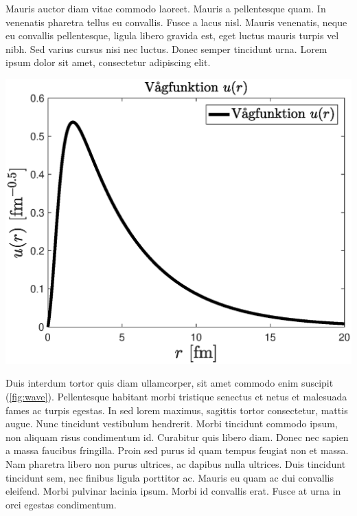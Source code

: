 Mauris auctor diam vitae commodo laoreet. Mauris a pellentesque quam. In venenatis pharetra tellus eu convallis. Fusce a lacus nisl. Mauris venenatis, neque eu convallis pellentesque, ligula libero gravida est, eget luctus mauris turpis vel nibh. Sed varius cursus nisi nec luctus. Donec semper tincidunt urna. Lorem ipsum dolor sit amet, consectetur adipiscing elit.

\begin{Figure}
 \includegraphics[width=\linewidth]{figures/waveFunction.eps}
 \captionsetup{labelfont=bf}
 \label{fig:wave}
\end{Figure}

Duis interdum tortor quis diam ullamcorper, sit amet commodo enim suscipit (\ref{fig:wave}). Pellentesque habitant morbi tristique senectus et netus et malesuada fames ac turpis egestas. In sed lorem maximus, sagittis tortor consectetur, mattis augue. Nunc tincidunt vestibulum hendrerit. Morbi tincidunt commodo ipsum, non aliquam risus condimentum id. Curabitur quis libero diam. Donec nec sapien a massa faucibus fringilla. Proin sed purus id quam tempus feugiat non et massa. Nam pharetra libero non purus ultrices, ac dapibus nulla ultrices. Duis tincidunt tincidunt sem, nec finibus ligula porttitor ac. Mauris eu quam ac dui convallis eleifend. Morbi pulvinar lacinia ipsum. Morbi id convallis erat. Fusce at urna in orci egestas condimentum.